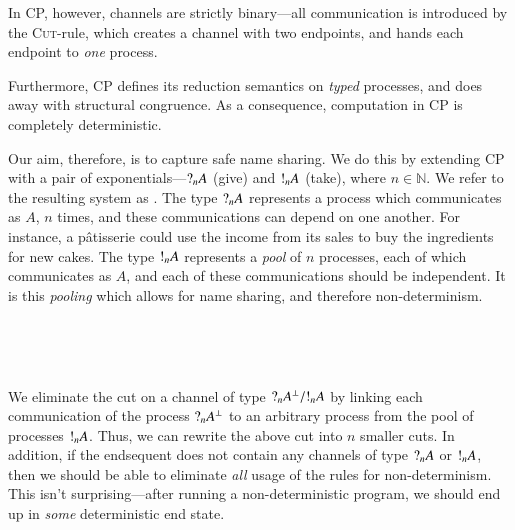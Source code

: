 \documentclass[twocolumn]{article}
\begin{document}
In CP, however, channels are strictly binary---all communication is introduced
by the \textsc{Cut}-rule, which creates a channel with two endpoints, and hands
each endpoint to \emph{one} process.
\begin{proofblock}
  \BIC{$\seq[{\nu x.(P \mid Q)}]{ \Gamma , \Delta }$}
\end{proofblock}
Furthermore, CP defines its reduction semantics on \emph{typed} processes, and
does away with structural congruence.
As a consequence, computation in CP is completely deterministic.

Our aim, therefore, is to capture safe name sharing.
We do this by extending CP with a pair of exponentials---$\give[n]{A}$ (give)
and $\take[n]{A}$ (take), where $n \in \mathbb{N}$.
We refer to the resulting system as \gtcp.
The type $\give[n]{A}$ represents a process which communicates as $A$, $n$
times, and these communications can depend on one another.
For instance, a p\^{a}tisserie could use the income from its sales to buy the
ingredients for new cakes.
The type $\take[n]{A}$ represents a \emph{pool} of $n$ processes, each of which
communicates as $A$, and each of these communications should be independent.
It is this \emph{pooling} which allows for name sharing, and therefore
non-determinism.
\begin{center}
  \begin{proofbox}
    \SYM{\give{}}
  \end{proofbox}
  \begin{proofbox}
    \SYM{\take{}}
  \end{proofbox}
  \\[1\baselineskip]
  \begin{proofbox}
  \end{proofbox}
  \\[1\baselineskip]
  \begin{proofbox}
  \end{proofbox}
\end{center}
We eliminate the cut on a channel of type $\give[n]{A^\bot} / \take[n]{A}$
by linking each communication of the process $\give[n]{A^\bot}$ to an arbitrary
process from the pool of processes $\take[n]{A}$. 
Thus, we can rewrite the above cut into $n$ smaller cuts.
In addition, if the endsequent does not contain any channels of type
$\give[n]{A}$ or $\take[n]{A}$, then we should be able to eliminate \emph{all}
usage of the rules for non-determinism. This isn't surprising---after running a
non-deterministic program, we should end up in \emph{some} deterministic end
state.
\end{document}
